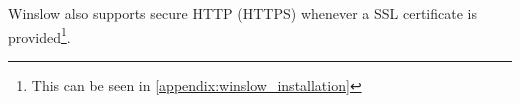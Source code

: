 Winslow also supports secure HTTP (HTTPS) whenever a SSL certificate is provided\footnote{This can be seen in \autoref{appendix:winslow_installation}}.

